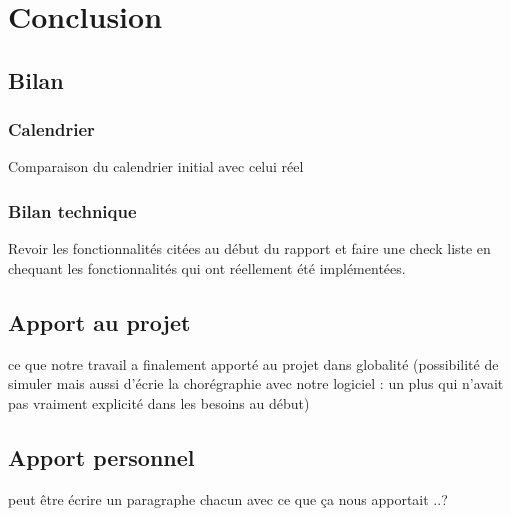 \section{Conclusion}
\subsection{Bilan}
\subsubsection{Calendrier}
Comparaison du calendrier initial avec celui réel

\subsubsection{Bilan technique}
Revoir les fonctionnalités citées au début du rapport et faire une check liste en chequant les fonctionnalités qui ont réellement été implémentées.

\subsection{Apport au projet}
ce que notre travail a finalement apporté au projet dans globalité (possibilité de simuler mais aussi d'écrie la chorégraphie avec notre logiciel : un plus qui n'avait pas vraiment explicité dans les besoins au début)

\subsection{Apport personnel}
peut être écrire un paragraphe chacun avec ce que ça nous apportait ..?